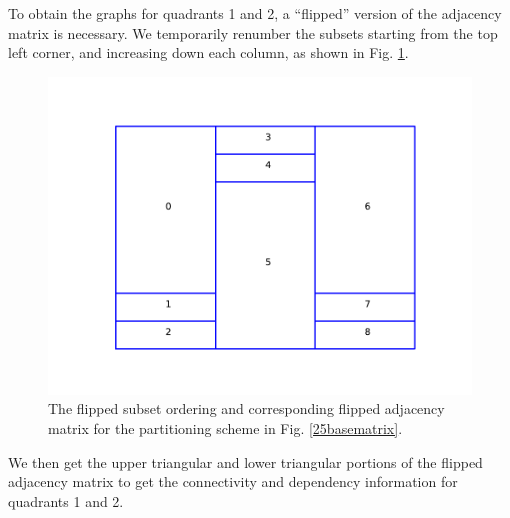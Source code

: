 To obtain the graphs for quadrants 1 and 2, a ``flipped'' version of the adjacency matrix is necessary. 
We temporarily renumber the subsets starting from the top left corner, and increasing down each column, as shown in Fig. \ref{25flippedmatrix}.
\begin{figure}[H]
\begin{minipage}[c]{0.5\textwidth}
\centering
\includegraphics[scale=0.55]{../../figures/boundaries_worst_flipped.pdf}
\end{minipage}
\begin{minipage}[c]{0.5\textwidth}
\centering
{}
\end{minipage}
\caption{The flipped subset ordering and corresponding flipped adjacency matrix for the partitioning scheme in Fig. \ref{25basematrix}.}
\label{25flippedmatrix}
\end{figure}
We then get the upper triangular and lower triangular portions of the flipped adjacency matrix to get the connectivity and dependency information for quadrants 1 and 2. 
